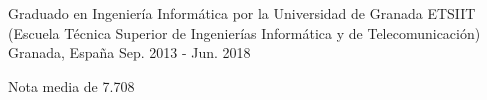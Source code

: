 

\begin{cventries}

  \cventry
    {Graduado en Ingeniería Informática por la Universidad de Granada} %
    {ETSIIT (Escuela Técnica Superior de Ingenierías Informática y de Telecomunicación)} %
    {Granada, España} %
    {Sep. 2013 - Jun. 2018} %
    {
      \begin{cvitems} %
        \item {Nota media de 7.708}
      \end{cvitems}
    }

\end{cventries}
